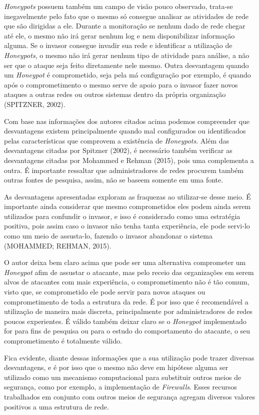 \textit{Honeypots} possuem também um campo de visão pouco observado, trata-se inegavelmente pelo fato que o mesmo só consegue analisar as atividades de rede que são dirigidas a ele. Durante a monitoração se nenhum dado de rede chegar até ele, o mesmo não irá gerar nenhum log e nem disponibilizar informação alguma. Se o invasor consegue invadir sua rede e identificar a utilização de \textit{Honeypots}, o mesmo não irá gerar nenhum tipo de atividade para análise, a não ser que o ataque seja feito diretamente nele mesmo. Outra desvantagem quando um \textit{Honeypot} é comprometido, seja pela má configuração por exemplo, é quando após o comprometimento o mesmo serve de apoio para o invasor fazer novos ataques a outras redes ou outros sistemas dentro da própria organização (SPITZNER, 2002).

Com base nas informações dos autores citados acima podemos compreender que desvantagens existem principalmente quando mal configurados ou identificados pelas características que comprovem a existência de \textit{Honeypots}. Além das desvantagens citadas por Spitzner (2002), é necessário também verificar as desvantagens citadas por Mohammed e Rehman (2015), pois uma complementa a outra. É importante ressaltar que administradores de redes procurem também outras fontes de pesquisa, assim, não se baseem somente em uma fonte.

As desvantagens apresentadas exploram as fraquezas ao utilizar-se desse meio. É importante ainda considerar que mesmo comprometidos eles podem ainda serem utilizados para confundir o invasor, e isso é considerado como uma estratégia positiva, pois assim caso o invasor não tenha tanta experiência, ele pode servi-lo como um meio de assusta-lo, fazendo o invasor abandonar o sistema (MOHAMMED; REHMAN, 2015).

O autor deixa bem claro acima que pode ser uma alternativa comprometer um \textit{Honeypot} afim de assustar o atacante, mas pelo receio das organizações em serem alvos de atacantes com mais experiência, o comprometimento não é tão comum, visto que, se comprometido ele pode servir para novos ataques ou comprometimento de toda a estrutura da rede. É por isso que é recomendável a utilização de maneira mais discreta, principalmente por administradores de redes poucos experientes. É válido também deixar claro se o \textit{Honeypot} implementado for para fins de pesquisa ou para o estudo do comportamento do atacante, o seu comprometimento é totalmente válido.

Fica evidente, diante dessas informações que a sua utilização pode trazer diversas desvantagens, e é por isso que o mesmo não deve em hipótese alguma ser utilizado como um mecanismo computacional para substituir outros meios de segurança, como por exemplo, a implementação de \textit{Firewalls}. Esses recursos trabalhados em conjunto com outros meios de segurança agregam diversos valores positivos a uma estrutura de rede.

